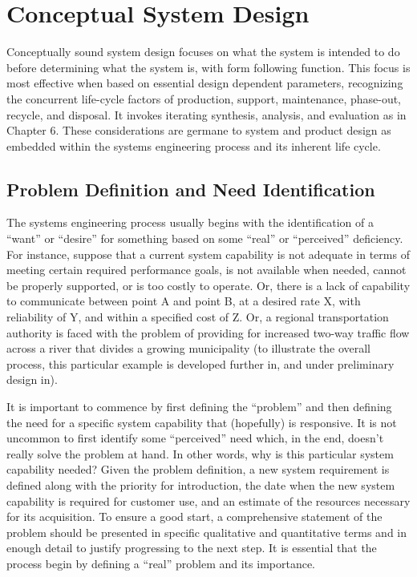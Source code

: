 \section{Conceptual System Design}

Conceptually sound system design focuses on what the system is intended to do before determining what the system is, with form following function. This focus is most effective when based on essential design dependent parameters, recognizing the concurrent life-cycle factors of production, support, maintenance, phase-out, recycle, and disposal. It invokes iterating synthesis, analysis, and evaluation as in Chapter 6. These considerations are germane to system and product design as embedded within the systems engineering process and its inherent life cycle.

\subsection{Problem Definition and Need Identification}

The systems engineering process usually begins with the identification of a ``want'' or ``desire'' for something based on some ``real'' or ``perceived'' deficiency. For instance, suppose that a current system capability is not adequate in terms of meeting certain required performance goals, is not available when needed, cannot be properly supported, or is too costly to operate. Or, there is a lack of capability to communicate between point A and point B, at a desired rate X, with reliability of Y, and within a specified cost of Z. Or, a regional transportation authority is faced with the problem of providing for increased two-way traffic flow across a river that divides a growing municipality (to illustrate the overall process, this particular example is developed further in, and under preliminary design in).

It is important to commence by first defining the ``problem'' and then defining the need for a specific system capability that (hopefully) is responsive. It is not uncommon to first identify some ``perceived'' need which, in the end, doesn’t really solve the problem at hand. In other words, why is this particular system capability needed? Given the problem definition, a new system requirement is defined along with the priority for introduction, the date when the new system capability is required for customer use, and an estimate of the resources necessary for its acquisition. To ensure a good start, a comprehensive statement of the problem should be presented in specific qualitative and quantitative terms and in enough detail to justify progressing to the next step. It is essential that the process begin by defining a ``real'' problem and its importance.

